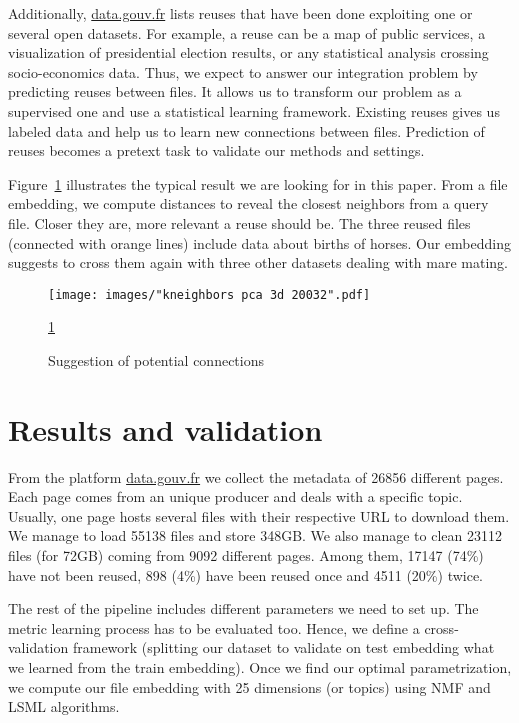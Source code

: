 \documentclass[a4paper]{article}
\begin{document}
	Additionally, \href{http://www.data.gouv.fr/fr/}{data.gouv.fr} lists reuses that have been done exploiting one or several open datasets. For example, a reuse can be a map of public services, a visualization of presidential election results, or any statistical analysis crossing socio-economics data. Thus, we expect to answer our integration problem by predicting reuses between files. It allows us to transform our problem as a supervised one and use a statistical learning framework. Existing reuses gives us labeled data and help us to learn new connections between files. Prediction of reuses becomes a pretext task to validate our methods and settings.
	
	Figure~\ref{fig:introduction} illustrates the typical result we are looking for in this paper. From a file embedding, we compute distances to reveal the closest neighbors from a query file. Closer they are, more relevant a reuse should be. The three reused files (connected with orange lines) include data about births of horses. Our embedding suggests to cross them again with three other datasets dealing with mare mating. 
	
	\begin{figure}[]
		\texttt{[image: images/"kneighbors pca 3d 20032".pdf]}
		\caption{Suggestion of potential connections}
		\label{fig:introduction}
		\ref{fig:introduction}
	\end{figure}
	
	\section{Results and validation}
	
	From the platform \href{http://www.data.gouv.fr/fr/}{data.gouv.fr} we collect the metadata of 26856 different pages. Each page comes from an unique producer and deals with a specific topic. Usually, one page hosts several files with their respective URL to download them. We manage to load 55138 files and store 348GB. We also manage to clean 23112 files (for 72GB) coming from 9092 different pages. Among them, 17147 (74\%) have not been reused, 898 (4\%) have been reused once and 4511 (20\%) twice.
	
	The rest of the pipeline includes different parameters we need to set up. The metric learning process has to be evaluated too. Hence, we define a cross-validation framework (splitting our dataset to validate on test embedding what we learned from the train embedding). Once we find our optimal parametrization, we compute our file embedding with 25 dimensions (or topics) using \ac{NMF} and \ac{LSML} algorithms.
	
\end{document}
